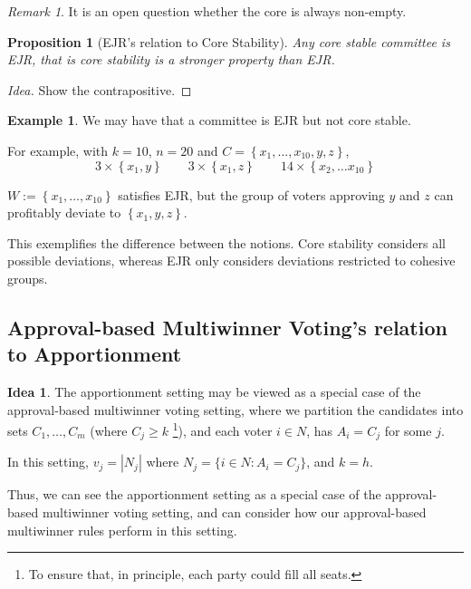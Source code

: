 \documentclass{book}
\theoremstyle{plain}
\newtheorem{proposition}[theorem]{Proposition}
\theoremstyle{definition}
\newtheorem{example}[theorem]{Example}
\newtheorem{idea}[theorem]{Idea}
\theoremstyle{remark}
\newtheorem{remark}[theorem]{Remark}
\newcommand{\set}[1]{\left\{#1\right\}}
\begin{document}
\begin{remark}
    It is an open question whether the core is always non-empty.
\end{remark}


\begin{proposition}[EJR's relation to Core Stability]
    Any core stable committee 
    is EJR, that is 
    core stability is 
    a stronger property than EJR.
\end{proposition}
\begin{proof}[Idea]
    Show the contrapositive.
\end{proof}
\begin{example}
    We may have that 
    a committee is EJR but not core stable.

    For example, with $k=10$, $n=20$ and $C = \set{x_1, \dots, x_{10}, y, z}$, 
    \[
        3 \times \set{x_1, y} \qquad 3 \times \set{x_1, z} 
        \qquad 14 \times \set{x_2, \dots x_{10}}
    \]
    
    $W := \set{x_1, \dots, x_10}$
    satisfies EJR, but the group of voters approving $y$ and $z$ can profitably deviate to $\set{x_1, y, z}$.

    This exemplifies the difference between the notions.
    Core stability considers all possible deviations, whereas 
    EJR only considers deviations restricted to cohesive groups.
\end{example}

\subsection{Approval-based Multiwinner Voting's relation to Apportionment}

\begin{idea}
    The apportionment setting may be viewed as a special case of 
    the approval-based multiwinner voting setting, where
    we partition the candidates into sets 
    $C_1, \dots, C_m$ (where $C_j \geq k$
    \footnote{To ensure that, in principle, each party could fill all 
    seats.}), and each voter $i \in N$, has 
    $A_i = C_j$ for some $j$.

    In this setting, 
    $v_j = |N_j|$ where $N_j = \{i \in N : A_i = C_j\}$, and
    $k = h$.

    Thus, we can see 
    the apportionment setting as a special case of the approval-based multiwinner voting setting, and
    can consider how our 
    approval-based multiwinner rules perform in this setting.
\end{idea}
\end{document}
